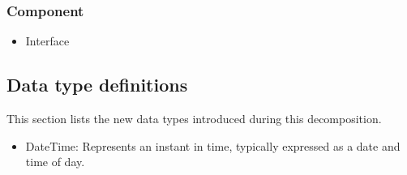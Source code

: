     \subsubsection{Component}
        \begin{itemize}
            \item Interface
        \end{itemize}

\subsection{Data type definitions}
    This section lists the new data types introduced during this decomposition.

    \begin{itemize}
        \item DateTime: Represents an instant in time, typically expressed as a date and time of day.
    \end{itemize}

